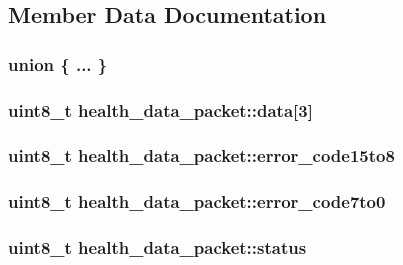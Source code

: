 \subsection{Member Data Documentation}
\hypertarget{structhealth__data__packet_a41edefdf6f0636add1f38358092aa86a}{\subsubsection[{"@17}]{\setlength{\rightskip}{0pt plus 5cm}union \{ ... \} }}\label{structhealth__data__packet_a41edefdf6f0636add1f38358092aa86a}
\hypertarget{structhealth__data__packet_a4039ceb368923f09e7d8e1cc7ada5760}{
\subsubsection[{data}]{\setlength{\rightskip}{0pt plus 5cm}uint8\-\_\-t health\-\_\-data\-\_\-packet\-::data\mbox{[}3\mbox{]}}}\label{structhealth__data__packet_a4039ceb368923f09e7d8e1cc7ada5760}
\hypertarget{structhealth__data__packet_a08f52ad70296c41370889f5f74f68908}{
\subsubsection[{error\-\_\-code15to8}]{\setlength{\rightskip}{0pt plus 5cm}uint8\-\_\-t health\-\_\-data\-\_\-packet\-::error\-\_\-code15to8}}\label{structhealth__data__packet_a08f52ad70296c41370889f5f74f68908}
\hypertarget{structhealth__data__packet_a4bb1d8b54ac0d82856dfa030cd981f90}{
\subsubsection[{error\-\_\-code7to0}]{\setlength{\rightskip}{0pt plus 5cm}uint8\-\_\-t health\-\_\-data\-\_\-packet\-::error\-\_\-code7to0}}\label{structhealth__data__packet_a4bb1d8b54ac0d82856dfa030cd981f90}
\hypertarget{structhealth__data__packet_a866832727429756e4f03fcad5cf2e240}{
\subsubsection[{status}]{\setlength{\rightskip}{0pt plus 5cm}uint8\-\_\-t health\-\_\-data\-\_\-packet\-::status}}\label{structhealth__data__packet_a866832727429756e4f03fcad5cf2e240}


